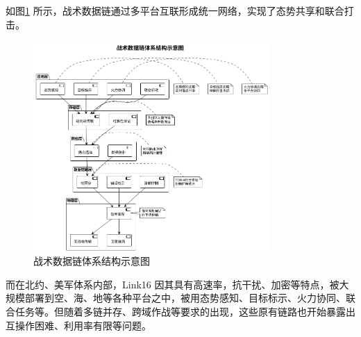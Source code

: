 \begin{table}[H]
    \caption{典型战术数据链对比}
    \label{table_tdl_compare}
    \centering
\end{table}

如图\ref{fig_tdl_architecture} 所示，战术数据链通过多平台互联形成统一网络，实现了态势共享和联合打击。

\begin{figure}[H]
    \centering
    \includegraphics[width=0.8\textwidth,height=0.5\textheight,keepaspectratio]{chapters/fig-0/tdl_architecture_simple.png}
    \caption{战术数据链体系结构示意图}
    \label{fig_tdl_architecture}
\end{figure}

而在北约、美军体系内部，{Link16} 因其具有高速率，抗干扰、加密等特点，被大规模部署到空、海、地等各种平台之中\cite{Ultra_ADSI_2023}，被用态势感知、目标标示、火力协同、联合任务等。但随着多链并存、跨域作战等要求的出现，这些原有链路也开始暴露出互操作困难、利用率有限等问题。

